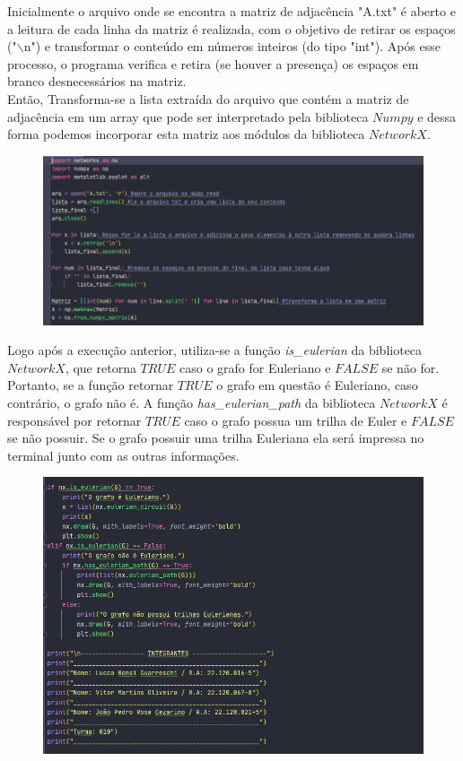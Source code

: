 \documentclass{article}
\begin{document}
		Inicialmente o arquivo onde se encontra a matriz de adjacência "A.txt" é aberto e a leitura de cada linha da matriz é realizada, com o objetivo de retirar os espaços ("$\backslash$n") e transformar o conteúdo em números inteiros (do tipo "int"). Após esse processo, o programa verifica e retira (se houver a presença) os espaços em branco desnecessários na matriz.\\
		
		Então, Transforma-se a lista extraída do arquivo que contém a matriz de adjacência em um array que pode ser interpretado pela biblioteca $Numpy$ e dessa forma podemos incorporar esta matriz aos módulos da biblioteca $NetworkX$.
		
		\begin{figure}[H]
			\centering
			\includegraphics[width=0.9\linewidth]{"Figuras/print1"}
			\label{fig:print1}
			\caption{}
		\end{figure}\vspace*{0.2cm}

 		Logo após a execução anterior, utiliza-se a função \textit{is\_eulerian} da biblioteca $NetworkX$, que retorna $TRUE$ caso o grafo for Euleriano e $FALSE$ se não for. Portanto, se a função retornar $TRUE$ o grafo em questão é Euleriano, caso contrário, o grafo não é. A função \textit{has\_eulerian\_path} da biblioteca $NetworkX$ é responsável por retornar $TRUE$ caso o grafo possua um trilha de Euler e $FALSE$ se não possuir. Se o grafo possuir uma trilha Euleriana ela será impressa no terminal junto com as outras informações.
 		
 		\begin{figure}[H]
 			\centering
 			\includegraphics[width=0.7\linewidth]{"Figuras/print2"}
 			\label{fig:print2}
 			\caption{}
 		\end{figure}\vspace*{0.2cm}
 	
\end{document}

